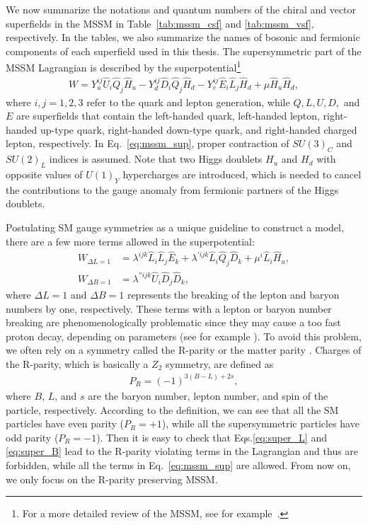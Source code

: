 \documentclass[12pt,twoside,book]{article}
\begin{document}
We now summarize the notations and quantum numbers of the chiral and vector superfields in the MSSM in Table~\ref{tab:mssm_csf} and \ref{tab:mssm_vsf}, respectively.
In the tables, we also summarize the names of bosonic and fermionic components of each superfield used in this thesis.
The supersymmetric part of the MSSM Lagrangian is described by the superpotential\footnote
{
  For a more detailed review of the MSSM, see for example~\cite{Martin:1997ns}.
}
\begin{align}
  W = Y_u^{i j} \hat{U}_i \hat{Q}_j \hat{H}_u - Y_d^{i j} \hat{D}_i \hat{Q}_j \hat{H}_d
  - Y_e^{i j} \hat{E}_i \hat{L}_j \hat{H}_d + \mu \hat{H}_u \hat{H}_d,
  \label{eq:mssm_sup}
\end{align}
where $i,j=1,2,3$ refer to the quark and lepton generation, while $Q, L, U, D,$ and $E$ are superfields that contain the left-handed quark, left-handed lepton, right-handed up-type quark, right-handed down-type quark, and right-handed charged lepton, respectively.
In Eq.~\eqref{eq:mssm_sup}, proper contraction of $SU(3)_C$ and $SU(2)_L$ indices is assumed.
Note that two Higgs doublets $H_u$ and $H_d$ with opposite values of $U(1)_Y$ hypercharges are introduced, which is needed to cancel the contributions to the gauge anomaly from fermionic partners of the Higgs doublets.

Postulating SM gauge symmetries as a unique guideline to construct a model, there are a few more terms allowed in the superpotential:
\begin{align}
  W_{\Delta L=1} &= \lambda^{ijk} \hat{L}_i \hat{L}_j \hat{E}_k + \lambda^{'ijk} \hat{L}_i \hat{Q}_j \hat{D}_k
  + \mu^i \hat{L}_i \hat{H}_u, \label{eq:super_L} \\
  W_{\Delta B=1} &= \lambda^{''ijk} \hat{U}_i \hat{D}_j \hat{D}_k, \label{eq:super_B}
\end{align}
where $\Delta L=1$ and $\Delta B=1$ represents the breaking of the lepton and baryon numbers by one, respectively.
These terms with a lepton or baryon number breaking are phenomenologically problematic since they may cause a too fast proton decay, depending on parameters (see for example \cite{Sakai:1981pk}).
To avoid this problem, we often rely on a symmetry called the R-parity \cite{Farrar:1978xj} or the matter parity \cite{Dimopoulos:1981zb, Weinberg:1981wj, Sakai:1981pk, Dimopoulos:1981yj}.
Charges of the R-parity, which is basically a $Z_2$ symmetry, are defined as
\begin{align}
  P_R = (-1)^{3(B-L)+2s},
\end{align}
where $B$, $L$, and $s$ are the baryon number, lepton number, and spin of the particle, respectively.
According to the definition, we can see that all the SM particles have even parity ($P_R = +1$), while all the supersymmetric particles have odd parity ($P_R = -1$).
Then it is easy to check that Eqs.\eqref{eq:super_L} and \eqref{eq:super_B} lead to the R-parity violating terms in the Lagrangian and thus are forbidden, while all the terms in Eq.~\eqref{eq:mssm_sup} are allowed.
From now on, we only focus on the R-parity preserving MSSM.
\end{document}
